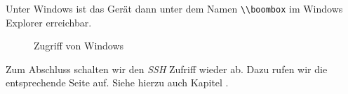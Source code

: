 \documentclass[12pt,a4paper]{article}
\newcommand{\code}[1]{\texttt{#1}}
\newcommand{\jpaimg}[2]{\begin{figure}[H]\centering\fbox{\texttt{[image: \#1]}}\caption{#2}\label{fig:#2}\end{figure}}
\begin{document}
\newpage
Unter Windows ist das Gerät dann unter dem Namen \code{\textbackslash{}\textbackslash{}boombox} im Windows Explorer erreichbar.

\jpaimg{./../images/win-bb.png}{Zugriff von Windows}

Zum Abschluss schalten wir den \textit{SSH} Zufriff wieder ab. Dazu rufen wir die entsprechende Seite auf. Siehe hierzu auch Kapitel .

\clearpage{}
\listoffigures\thispagestyle{fancy}
\newpage


\renewcommand{\indexname}{Stichwortverzeichnis}
\clearpage{}
\printindex\thispagestyle{fancy}
\newpage
\end{document}
